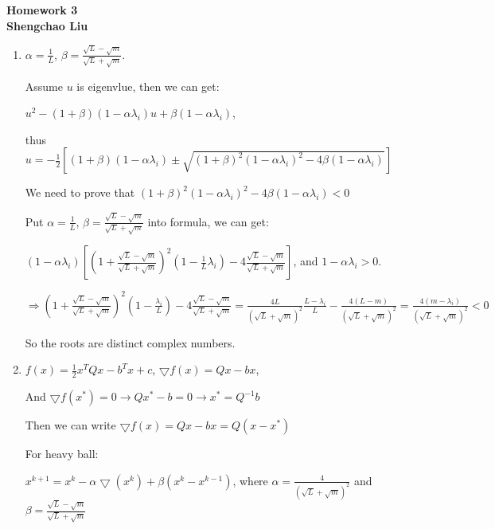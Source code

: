 \documentclass[12pt]{article}
\begin{document}
\begin{center} {\Large
{\bf Homework 3\\Shengchao Liu}}
\end{center}

\begin{enumerate}

\item

$\alpha = \frac{1}{L}$, $\beta = \frac{\sqrt{L} - \sqrt{m}}{\sqrt{L} + \sqrt{m}}$.

Assume $u$ is eigenvlue, then we can get:

$u^2 - (1+\beta)(1-\alpha \lambda_i)u + \beta(1-\alpha \lambda_i)$,

thus $u = - \frac{1}{2} [(1+\beta)(1-\alpha\lambda_i) \pm \sqrt{(1+\beta)^2(1-\alpha\lambda_i)^2 - 4\beta(1-\alpha \lambda_i)} ]$

We need to prove that $(1+\beta)^2(1-\alpha\lambda_i)^2 - 4\beta(1-\alpha \lambda_i)<0$

Put $\alpha = \frac{1}{L}$, $\beta = \frac{\sqrt{L} - \sqrt{m}}{\sqrt{L} + \sqrt{m}}$ into formula, we can get:

$(1-\alpha \lambda_i)[(1+\frac{\sqrt{L} - \sqrt{m}}{\sqrt{L} + \sqrt{m}})^2(1-\frac{1}{L}\lambda_i) - 4\frac{\sqrt{L} - \sqrt{m}}{\sqrt{L} + \sqrt{m}}] $, and $1-\alpha \lambda_i>0$.

$ \Longrightarrow (1+\frac{\sqrt{L} - \sqrt{m}}{\sqrt{L} + \sqrt{m}})^2(1-\frac{\lambda_i}{L}) - 4\frac{\sqrt{L} - \sqrt{m}}{\sqrt{L} + \sqrt{m}} = \frac{4L}{(\sqrt{L} + \sqrt{m})^2} \frac{L-\lambda_i}{L} - \frac{4(L-m)}{(\sqrt{L} + \sqrt{m})^2} = \frac{4(m-\lambda_i)}{(\sqrt{L} + \sqrt{m})^2} < 0$

So the roots are distinct complex numbers.

\bigskip







\item

$f(x) = \frac{1}{2} x^T Q x - b^T x + c$, $\bigtriangledown f(x) = Qx - bx$,

And $\bigtriangledown f(x^*)=0 \rightarrow Qx^* - b =0 \rightarrow x^* = Q^{-1}b$

Then we can write $\bigtriangledown f(x) = Qx - bx = Q(x-x^*)$

For heavy ball:

$x^{k+1} = x^k - \alpha \bigtriangledown(x^k) + \beta (x^k - x^{k-1})$,  where $\alpha = \frac{4}{(\sqrt{L} + \sqrt{m})^2}$ and $\beta = \frac{\sqrt{L} - \sqrt{m}}{\sqrt{L} + \sqrt{m}}$


\end{enumerate}
\end{document}
